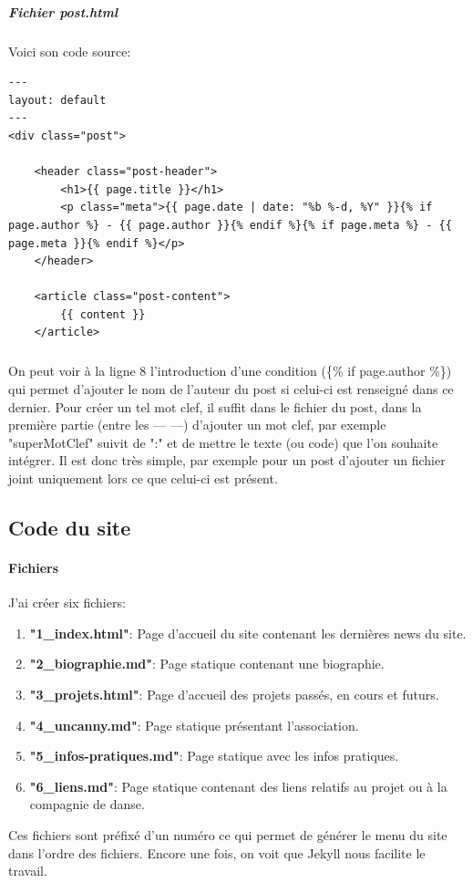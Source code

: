 \documentclass[11pt,a4paper,twoside]{report}
\begin{document}
				\subparagraph{Fichier post.html}Voici son code source:
					\lstset{caption=Fichier "post.html" généré par JekyllRB, language=HTML}
					\begin{lstlisting}
---
layout: default
---
<div class="post">

	<header class="post-header">
		<h1>{{ page.title }}</h1>
		<p class="meta">{{ page.date | date: "%b %-d, %Y" }}{% if page.author %} - {{ page.author }}{% endif %}{% if page.meta %} - {{ page.meta }}{% endif %}</p>
	</header>

	<article class="post-content">
		{{ content }}
	</article>
					\end{lstlisting}
				\subparagraph*{}On peut voir à la ligne 8 l'introduction d'une condition (\{\% if page.author \%\}) qui permet d'ajouter le nom de l'auteur du post si celui-ci est renseigné dans ce dernier. Pour créer un tel mot clef, il suffit dans le fichier du post, dans la première partie (entre les --- ---) d'ajouter un mot clef, par exemple "superMotClef" suivit de ":" et de mettre le texte (ou code) que l'on souhaite intégrer. Il est donc très simple, par exemple pour un post d'ajouter un fichier joint uniquement lors ce que celui-ci est présent.

		\subsection{Code du site}
			\paragraph{Fichiers}J'ai créer six fichiers:
				\begin{enumerate}
					\item \textbf{"1\_index.html"}:			Page d'accueil du site contenant les dernières news du site.
					\item \textbf{"2\_biographie.md"}: 		Page statique contenant une biographie.
					\item \textbf{"3\_projets.html"}:		Page d'accueil des projets passés, en cours et futurs.
					\item \textbf{"4\_uncanny.md"}:			Page statique présentant l'association.
					\item \textbf{"5\_infos-pratiques.md"}:	Page statique avec les infos pratiques.
					\item \textbf{"6\_liens.md"}:			Page statique contenant des liens relatifs au projet ou à la compagnie de danse.
				\end{enumerate}
			Ces fichiers sont préfixé d'un numéro ce qui permet de générer le menu du site dans l'ordre des fichiers. Encore une fois, on voit que Jekyll nous facilite le travail.
\end{document}
